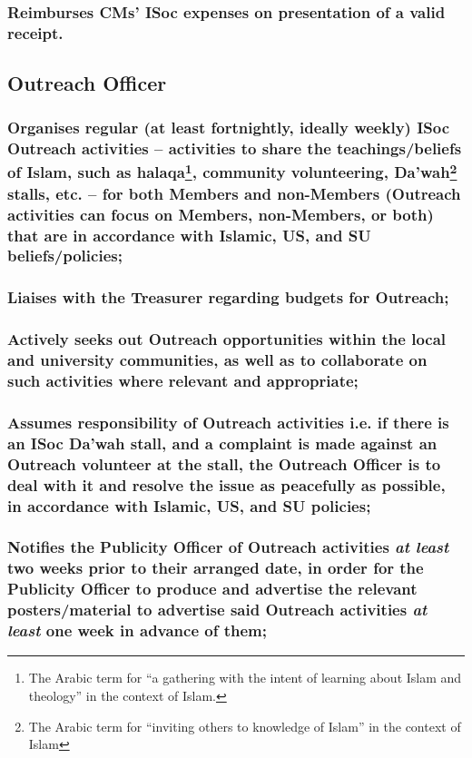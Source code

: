 \documentclass[12pt]{article}
\begin{document}
\subsubsection{Reimburses CMs' ISoc expenses on presentation of a valid receipt.}
\hspace{1pt}

\subsection{Outreach Officer}
\subsubsection{Organises regular (at least fortnightly, ideally weekly) ISoc Outreach activities -- activities to share the teachings/beliefs of Islam, such as halaqa\protect\footnote{The Arabic term for ``a gathering with the intent of learning about Islam and theology'' in the context of Islam.}, community volunteering, Da'wah\protect\footnote{The Arabic term for ``inviting others to knowledge of Islam'' in the context of Islam} stalls, etc. -- for both Members and non-Members (Outreach activities can focus on Members, non-Members, or both) that are in accordance with Islamic, US, and SU beliefs/policies;}
\subsubsection{Liaises with the Treasurer regarding budgets for Outreach;}
\subsubsection{Actively seeks out Outreach opportunities within the local and university communities, as well as to collaborate on such activities where relevant and appropriate;}
\subsubsection{Assumes responsibility of Outreach activities i.e. if there is an ISoc Da'wah stall, and a complaint is made against an Outreach volunteer at the stall, the Outreach Officer is to deal with it and resolve the issue as peacefully as possible, in accordance with Islamic, US, and SU policies;}
\subsubsection{Notifies the Publicity Officer of Outreach activities \emph{at least} two weeks prior to their arranged date, in order for the Publicity Officer to produce and advertise the relevant posters/material to advertise said Outreach activities \emph{at least} one week in advance of them;}
\end{document}
